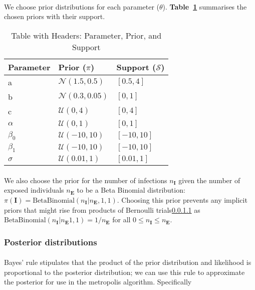 \paragraph{}We choose prior distributions for each parameter \pi($\theta$). \textbf{Table~\ref{tab:priorsA}} summarises the chosen priors with their support. 

\begin{table}[ht]
    \centering
    \begin{tabular}{|l|l|l|}
        \hline
        \textbf{Parameter} & \textbf{Prior ($\pi$)} & \textbf{Support ($\mathcal{S}$)} \\
        \hline
        a & $\mathcal{N}(1.5, 0.5)$ & $[0.5, 4]$ \\
        \hline
        b & $\mathcal{N}(0.3, 0.05)$ & $[0, 1]$ \\
        \hline
        c & $\mathcal{U}(0, 4)$ & $[0, 4]$ \\
        \hline
        $\alpha$ & $\mathcal{U}(0, 1)$ & $[0, 1]$ \\
        \hline
        $\beta_0$ & $\mathcal{U}(-10, 10)$ & $[-10, 10]$ \\
        \hline
        $\beta_1$ & $\mathcal{U}(-10, 10)$ & $[-10, 10]$ \\
        \hline
        $\sigma$ &  $\mathcal{U}(0.01, 1)$ & $[0.01, 1]$ \\
        \hline
    \end{tabular}
    \caption{Table with Headers: Parameter, Prior, and Support}
    \label{tab:priorsA}
\end{table}

\paragraph{}We also choose the prior for the number of infections $n_\mathbf{I}$ given the number of exposed individuals $n_\mathbf{E}$ to be a Beta Binomial distribution: $\pi(\mathbf{I}) = \text{BetaBinomial}(n_\mathbf{I} | n_\mathbf{E}, 1, 1)$. Choosing this prior prevents any implicit priors that might rise from products of Bernoulli trials\ref{} as $\text{BetaBinomial}(n_\mathbf{I} | n_\mathbf{E} 1, 1) = 1 / n_\mathbf{E}$ for all $0 \leq n_\mathbf{I} \leq n_\mathbf{E}$. 


\subsubsection{Posterior distributions}

\paragraph{}Bayes' rule stipulates that the product of the prior distribution and likelihood is proportional to the posterior distribution; we can use this rule to approximate the posterior for use in the metropolis algorithm. Specifically 

